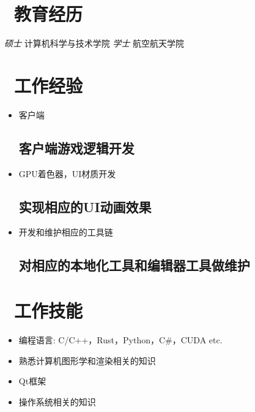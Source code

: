 \documentclass{resume}
\begin{document}



\section{\faGraduationCap\ 教育经历}
\textit{硕士} 计算机科学与技术学院
\textit{学士} 航空航天学院

\section{\faUsers\ 工作经验}
\begin{itemize}
  \item 客户端
  \subsection{客户端游戏逻辑开发}

  \item GPU着色器，UI材质开发
  \subsection{实现相应的UI动画效果}

  \item 开发和维护相应的工具链
  \subsection{对相应的本地化工具和编辑器工具做维护}

\end{itemize}

\section{\faCogs\ 工作技能}
\begin{itemize}[parsep=0.5ex]
  \item 编程语言: C/C++，Rust，Python，C\#，CUDA etc.
  \item 熟悉计算机图形学和渲染相关的知识
  \item Qt框架
  \item 操作系统相关的知识
\end{itemize}
\end{document}
